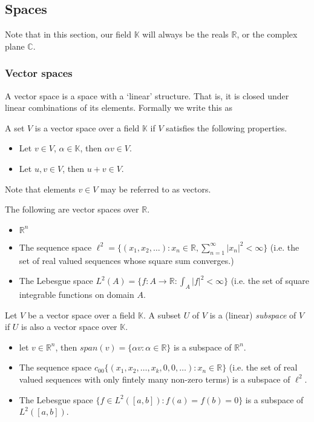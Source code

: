 \subsection{Spaces}
Note that in this section, our field $\mathbb{K}$ will always be the reals $\mathbb{R}$, or the complex plane $\mathbb{C}$.
\subsubsection{Vector spaces}
A vector space is a space with a `linear' structure. That is, it is closed under linear combinations of its elements. Formally we write this as 
\begin{defn}
A set $V$ is a vector space over a field $\mathbb{K}$ if $V$ satisfies the following properties.
\begin{itemize}
	\item Let $v\in V$, $\alpha\in\mathbb{K}$, then $\alpha v\in V$.
	\item Let $u,v \in V$, then $u+v \in V$.
\end{itemize}
\end{defn}
Note that elements $v\in V$ may be referred to as vectors.
\begin{eg}
The following are vector spaces over $\mathbb{R}$.
\begin{itemize}
\item $\mathbb{R}^n$
\item The sequence space $\ell^2 = \lbrace (x_1,x_2,\dots):x_n\in \mathbb{R},\sum_{n=1}^\infty |x_n|^2 <\infty \rbrace$ (i.e. the set of real valued sequences whose square sum converges.)
\item The Lebesgue space $L^2(A) = \lbrace f:A\rightarrow \mathbb{R} : \int_A |f|^2<\infty \rbrace$ (i.e. the set of square integrable functions on domain $A$.
\end{itemize}
\end{eg}

\begin{defn}
Let $V$ be a vector space over a field $\mathbb{K}$. A subset $U$ of $V$ is a (linear) \emph{subspace} of $V$ if $U$ is also a vector space over $\mathbb{K}$.
\end{defn}

\begin{eg}
\begin{itemize}
\item let $v\in \mathbb{R}^n$, then $span(v)=\lbrace \alpha v:\alpha \in \mathbb{R} \rbrace$ is a subspace of $\mathbb{R}^n$.
\item The sequence space $c_{00}\lbrace (x_1,x_2,\dots,x_k,0,0,\dots):x_n\in \mathbb{R} \rbrace$ (i.e. the set of real valued sequences with only fintely many non-zero terms) is a subspace of $\ell^2$.
\item The Lebesgue space $\lbrace f \in L^2([a,b]) : f(a)=f(b)=0 \rbrace$ is a subspace of $L^2([a,b])$.
\end{itemize}
\end{eg}

